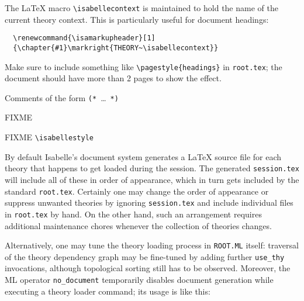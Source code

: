 \begin{isabellebody}
\begin{isamarkuptext}
  \medskip The {\LaTeX} macro \verb,\isabellecontext, is maintained to
  hold the name of the current theory context.  This is particularly
  useful for document headings:

\begin{verbatim}
  \renewcommand{\isamarkupheader}[1]
  {\chapter{#1}\markright{THEORY~\isabellecontext}}
\end{verbatim}

  \noindent Make sure to include something like
  \verb,\pagestyle{headings}, in \texttt{root.tex}; the document
  should have more than 2 pages to show the effect.%
\end{isamarkuptext}%
\isamarkuptrue%
%
\isamarkuptrue%
%
\begin{isamarkuptext}%
Comments of the form \verb,(,\verb,*,~\dots~\verb,*,\verb,),

  FIXME%
\end{isamarkuptext}%
\isamarkuptrue%
%
\isamarkuptrue%
%
\begin{isamarkuptext}%
FIXME \verb,\isabellestyle,%
\end{isamarkuptext}%
\isamarkuptrue%
%
\isamarkuptrue%
%
\begin{isamarkuptext}%
By default Isabelle's document system generates a {\LaTeX} source
  file for each theory that happens to get loaded during the session.
  The generated \texttt{session.tex} will include all of these in
  order of appearance, which in turn gets included by the standard
  \texttt{root.tex}.  Certainly one may change the order of appearance
  or suppress unwanted theories by ignoring \texttt{session.tex} and
  include individual files in \texttt{root.tex} by hand.  On the other
  hand, such an arrangement requires additional maintenance chores
  whenever the collection of theories changes.

  Alternatively, one may tune the theory loading process in
  \texttt{ROOT.ML} itself: traversal of the theory dependency graph
  may be fine-tuned by adding further \verb,use_thy, invocations,
  although topological sorting still has to be observed.  Moreover,
  the ML operator \verb,no_document, temporarily disables document
  generation while executing a theory loader command; its usage is
  like this:


\end{isamarkuptext}
\end{isabellebody}
